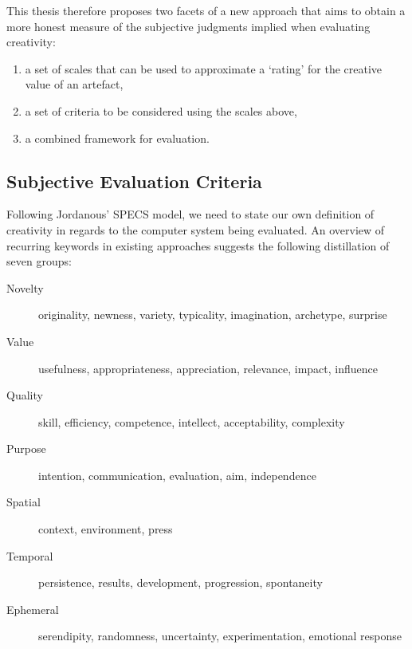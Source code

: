 This thesis therefore proposes two facets of a new approach that aims to obtain a more honest measure of the subjective judgments implied when evaluating creativity:

\begin{enumerate}
  \item a set of scales that can be used to approximate a `rating' for the creative value of an artefact,
  \item a set of criteria to be considered using the scales above,
  \item a combined framework for evaluation.
\end{enumerate}


\subsection{Subjective Evaluation Criteria}
\label{s:sec}

Following Jordanous' \ac{SPECS} model, we need to state our own definition of creativity in regards to the computer system being evaluated. An overview of recurring keywords in existing approaches suggests the following distillation of seven groups:

\begin{description}
  \item [Novelty] originality, newness, variety, typicality, imagination, archetype, surprise
  \item [Value] usefulness, appropriateness, appreciation, relevance, impact, influence
  \item [Quality] skill, efficiency, competence, intellect, acceptability, complexity
  \item [Purpose] intention, communication, evaluation, aim, independence
  \item [Spatial] context, environment, press
  \item [Temporal] persistence, results, development, progression, spontaneity
  \item [Ephemeral] serendipity, randomness, uncertainty, experimentation, emotional response
\end{description}

